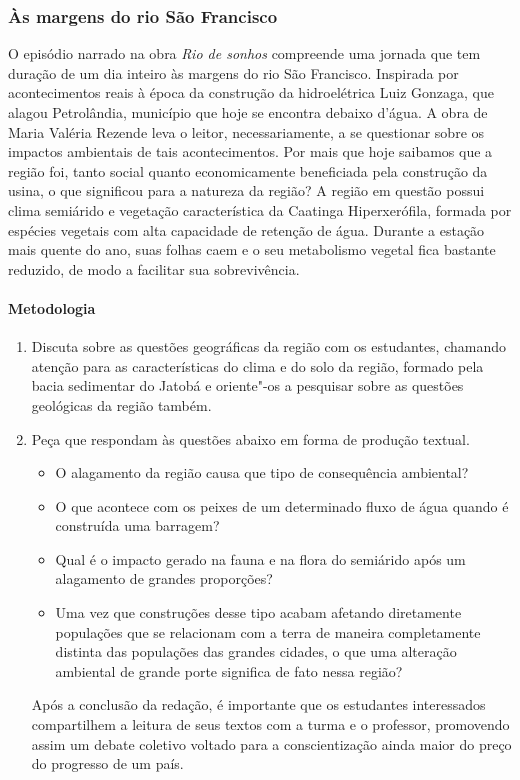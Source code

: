 \documentclass[12pt]{extarticle}
\begin{document}
\subsubsection{Às margens do rio São Francisco}

  O episódio narrado na obra \emph{Rio de sonhos} compreende uma jornada
  que tem duração de um dia inteiro às margens do rio São Francisco.
  Inspirada por acontecimentos reais à época da construção da
  hidroelétrica Luiz Gonzaga, que alagou Petrolândia, município que hoje
  se encontra debaixo d'água. A obra de Maria Valéria Rezende leva o
  leitor, necessariamente, a se questionar sobre os impactos ambientais
  de tais acontecimentos. Por mais que hoje saibamos que a região foi,
  tanto social quanto economicamente beneficiada pela construção da
  usina, o que significou para a natureza da região? A região em questão
  possui clima semiárido e vegetação característica da Caatinga
  Hiperxerófila, formada por espécies vegetais com alta capacidade de
  retenção de água. Durante a estação mais quente do ano, suas folhas
  caem e o seu metabolismo vegetal fica bastante reduzido, de modo a
  facilitar sua sobrevivência.

\paragraph{Metodologia}
\begin{enumerate}
\item Discuta sobre as questões geográficas da região com os estudantes,
chamando atenção para as características do clima e do solo da
região, formado pela bacia sedimentar do Jatobá e oriente"-os a
pesquisar sobre as questões geológicas da região também.


\item Peça que respondam às questões abaixo em forma de produção textual.
\begin{itemize}
\item
  O alagamento da região causa que tipo de consequência ambiental?
\item
  O que acontece com os peixes de um determinado fluxo de água quando é
  construída uma barragem?
\item
  Qual é o impacto gerado na fauna e na flora do semiárido após um
  alagamento de grandes proporções?
\item
  Uma vez que construções desse tipo acabam afetando diretamente
  populações que se relacionam com a terra de maneira completamente
  distinta das populações das grandes cidades, o que uma alteração
  ambiental de grande porte significa de fato nessa região?
\end{itemize}

Após a conclusão da redação, é importante que os estudantes
interessados compartilhem a leitura de seus textos com a turma e o
professor, promovendo assim um debate coletivo voltado para a
conscientização ainda maior do preço do progresso de um país.
\end{enumerate}
\end{document}
